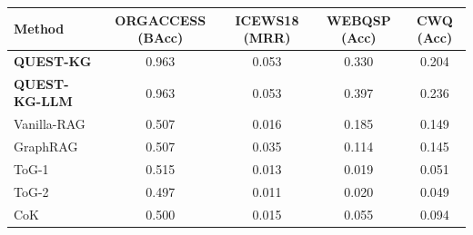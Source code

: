 \begin{tabular}{lcccc}
\toprule
\textbf{Method} & ORGACCESS (\textbf{BAcc}) & ICEWS18 (\textbf{MRR}) & WEBQSP (\textbf{Acc}) & CWQ (\textbf{Acc}) \\
\midrule
\textbf{QUEST-KG} & 0.963 & 0.053 & 0.330 & 0.204 \\
\textbf{QUEST-KG-LLM} & 0.963 & 0.053 & 0.397 & 0.236 \\
Vanilla-RAG & 0.507 & 0.016 & 0.185 & 0.149 \\
GraphRAG & 0.507 & 0.035 & 0.114 & 0.145 \\
ToG-1 & 0.515 & 0.013 & 0.019 & 0.051 \\
ToG-2 & 0.497 & 0.011 & 0.020 & 0.049 \\
CoK & 0.500 & 0.015 & 0.055 & 0.094 \\
\bottomrule
\end{tabular}

